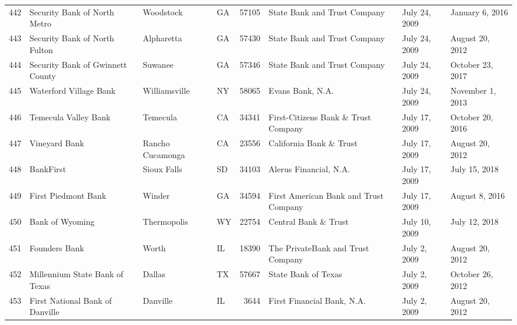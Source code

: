 \begin{tabular}{llllrlll}
442 &                       Security Bank of North Metro &           Woodstock &  GA &  57105 &                       State Bank and Trust Company &       July 24, 2009 &     January 6, 2016 \\
443 &                      Security Bank of North Fulton &          Alpharetta &  GA &  57430 &                       State Bank and Trust Company &       July 24, 2009 &     August 20, 2012 \\
444 &                   Security Bank of Gwinnett County &             Suwanee &  GA &  57346 &                       State Bank and Trust Company &       July 24, 2009 &    October 23, 2017 \\
445 &                             Waterford Village Bank &       Williamsville &  NY &  58065 &                                   Evans Bank, N.A. &       July 24, 2009 &    November 1, 2013 \\
446 &                               Temecula Valley Bank &            Temecula &  CA &  34341 &                First-Citizens Bank \& Trust Company &       July 17, 2009 &    October 20, 2016 \\
447 &                                      Vineyard Bank &    Rancho Cucamonga &  CA &  23556 &                            California Bank \& Trust &       July 17, 2009 &     August 20, 2012 \\
448 &                                          BankFirst &         Sioux Falls &  SD &  34103 &                             Alerus Financial, N.A. &       July 17, 2009 &       July 15, 2018 \\
449 &                                First Piedmont Bank &              Winder &  GA &  34594 &              First American Bank and Trust Company &       July 17, 2009 &      August 8, 2016 \\
450 &                                    Bank of Wyoming &         Thermopolis &  WY &  22754 &                               Central Bank \& Trust &       July 10, 2009 &       July 12, 2018 \\
451 &                                      Founders Bank &               Worth &  IL &  18390 &                  The PrivateBank and Trust Company &        July 2, 2009 &     August 20, 2012 \\
452 &                     Millennium State Bank of Texas &              Dallas &  TX &  57667 &                                State Bank of Texas &        July 2, 2009 &    October 26, 2012 \\
453 &                    First National Bank of Danville &            Danville &  IL &   3644 &                         First Financial Bank, N.A. &        July 2, 2009 &     August 20, 2012 \\

\end{tabular}
